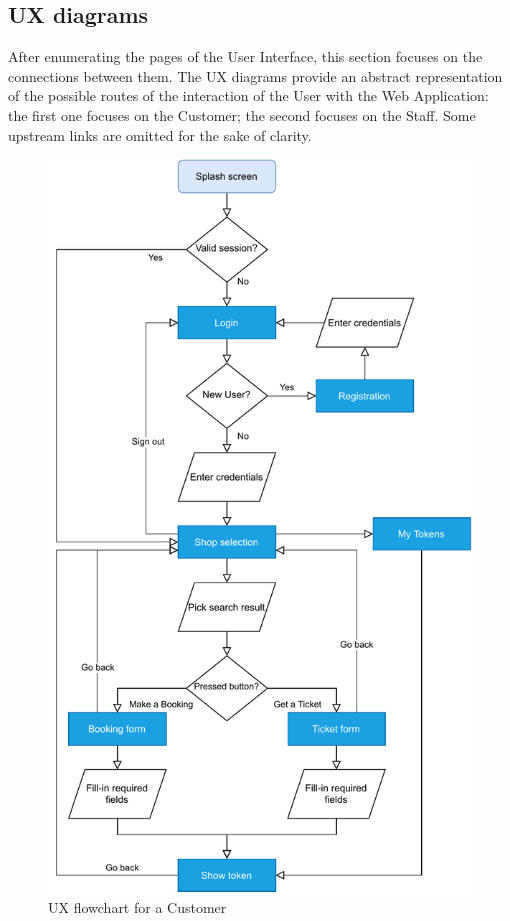 \subsection{UX diagrams}
After enumerating the pages of the User Interface, this section focuses on the connections between them. The UX diagrams provide an abstract representation of the possible routes of the interaction of the User with the Web Application: the first one focuses on the Customer; the second focuses on the Staff. Some upstream links are omitted for the sake of clarity.
\begin{figure}[H]
    \centering
    \includegraphics[height=0.85\textheight]{Images/ux-flowchart.pdf}
    \caption{UX flowchart for a Customer}
\end{figure}
